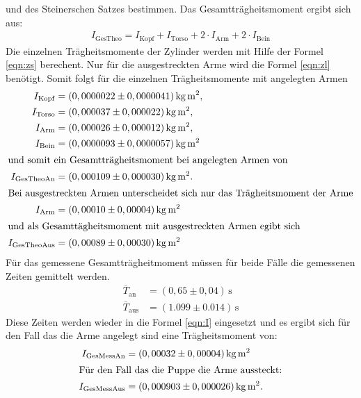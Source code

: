 und des Steinerschen Satzes bestimmen. Das Gesamtträgheitsmoment ergibt sich aus:
\begin{align}
  I_\mathrm{GesTheo}=I_\mathrm{Kopf}+I_\mathrm{Torso}+2\cdot I_\mathrm{Arm}+2\cdot I_\mathrm{Bein}
\end{align}
Die einzelnen Trägheitsmomente der Zylinder werden
mit Hilfe der Formel \eqref{eqn:zs} berechent.
Nur für die ausgestreckten Arme wird
die Formel \eqref{eqn:zl} benötigt.
Somit folgt für die einzelnen Trägheitsmomente mit angelegten Armen
\begin{align*}
I_\mathrm{Kopf} &=(0,0000022\pm0,0000041)\,\si{\kilo\gram\meter\squared},\\
I_\mathrm{Torso}&=(0,000037\pm0,000022)\,\si{\kilo\gram\meter\squared},\\
I_\mathrm{Arm}  &=(0,000026\pm0,000012)\,\si{\kilo\gram\meter\squared},\\
I_\mathrm{Bein} &=(0,0000093\pm0,0000057)\,\si{\kilo\gram\meter\squared}\\
\intertext{und somit ein Gesamtträgheitsmoment bei angelegten Armen von}
I_\mathrm{GesTheoAn}&=(0,000109\pm0,000030)\,\si{\kilo\gram\meter\squared}.\\
\intertext{Bei ausgestreckten Armen unterscheidet sich nur das Trägheitsmoment der Arme}
I_\mathrm{Arm}&=(0,00010\pm0,00004)\,\si{\kilo\gram\meter\squared}\\
\intertext{und als Gesamttägheitsmoment mit ausgestreckten Armen egibt sich}
I_\mathrm{GesTheoAus}&=(0,00089\pm0,00030)\,\si{\kilo\gram\meter\squared}\\
\end{align*}
Für das gemessene Gesamtträgheitmoment
müssen für beide Fälle
die gemessenen Zeiten gemittelt werden.
\begin{align*}
\overline{T}_\mathrm{an} &=(0,65\pm0,04)\,\si{\second}\\
\overline{T}_\mathrm{aus}&=(1.099\pm0.014)\,\si{\second}
\end{align*}
Diese Zeiten werden wieder in die Formel \eqref{eqn:I}
eingesetzt und es ergibt sich für den Fall das
die Arme angelegt sind eine Trägheitsmoment von:
\begin{align*}
I_\mathrm{GesMessAn}&=(0,00032\pm0,00004)\,\si{\kilo\gram\meter\squared}\\
\intertext{Für den Fall das die Puppe die Arme aussteckt:}
I_\mathrm{GesMessAus}&= (0,000903\pm0,000026)\,\si{\kilo\gram\meter\squared}.\\
\end{align*}
